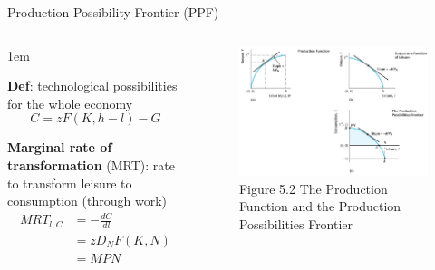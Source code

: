 \documentclass[11pt,aspectratio=43]{beamer}
\let\olditemize=\itemize
\let\endolditemize=\enditemize
\renewenvironment{itemize}{\olditemize \itemsep1em}{\endolditemize}
\theoremstyle{definition}
\begin{document}
\begin{frame}{Production Possibility Frontier (PPF)}
\label{slide:Production_Possibility_Frontier__PPF_}
\begin{columns}
    \begin{column}{0.5\textwidth}
        \begin{itemize}
            \item \textbf{Def}: technological possibilities for the whole economy
            \begin{equation}
            \label{eq:PPF}
                C = z F( K, h-l ) - G
            \end{equation}
            \item \textbf{Marginal rate of transformation} (MRT): rate to transform leisure to consumption (through work)
            \begin{equation}
            \label{eq:MRT}
                \begin{split}
                    MRT_{l, C}
                        & = - \frac{dC}{dl}
                    \\
                        & = z D_{N} F( K, N )
                    \\
                        & = MPN
                    \\
                \end{split}
            \end{equation}
        \end{itemize}
    \end{column}
    \begin{column}{0.5\textwidth}
        \begin{figure}
            \caption{\scriptsize Figure 5.2 The Production Function and the Production Possibilities Frontier}
            \includegraphics[width=\textwidth]{./figures/Figure5_2.jpg}
        \end{figure}
    \end{column}
\end{columns}
\end{frame}
\end{document}
